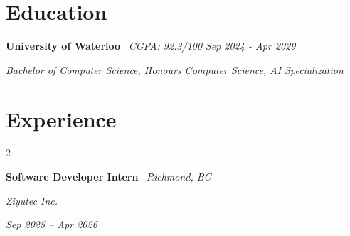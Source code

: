 \documentclass[10pt, letterpaper]{article}
\newenvironment{twocolentry}[2][]{
    \onecolentry
    \def\secondColumn{#2}
    \setcolumnwidth{\fill, 4.5 cm}
    \begin{paracol}{2}
}{
    \switchcolumn \raggedleft \secondColumn
    \end{paracol}
    \endonecolentry
}
\begin{document}
    \section{Education}

    \hspace{0.5em} \textbf{University of Waterloo} \textbar\ \textit{CGPA: 92.3/100} \hfill \textit{Sep 2024 - Apr 2029}

    \hspace{0.5em} \textit{Bachelor of Computer Science, Honours Computer Science, AI Specialization}

    \vspace{0.10 cm}


    \section{Experience}

    \begin{twocolentry}{

    \textit{Sep 2025 -- Apr 2026}}
        \textbf{Software Developer Intern} \textbar\ \textit{Richmond, BC}
        
        \textit{Ziyutec Inc.}
    \end{twocolentry}
\end{document}
